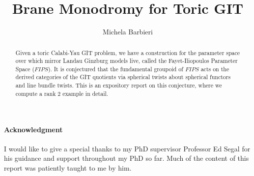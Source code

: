 \documentclass[oneside,reqno]{amsart}
\title{Brane Monodromy for Toric GIT}
\author[]{Michela Barbieri}
\theoremstyle{definition}
\theoremstyle{definition}
\theoremstyle{definition}
\theoremstyle{definition}
\begin{document}
\maketitle
\tableofcontents

\begin{abstract}
    Given a toric Calabi-Yau GIT problem, we have a construction for the parameter space over which mirror Landau Ginzburg models live, called the Fayet-Iliopoulos Parameter Space ($FIPS$). It is conjectured that the fundamental groupoid of $FIPS$ acts on the derived categories of the GIT quotients via spherical twists about spherical functors and line bundle twists. This is an expository report on this conjecture, where we compute a rank 2 example in detail.
\end{abstract}

\paragraph*{Acknowledgment}
I would like to give a special thanks to my PhD supervisor Professor Ed Segal for his guidance and support throughout my PhD so far. Much of the content of this report was patiently taught to me by him. 
\end{document}
